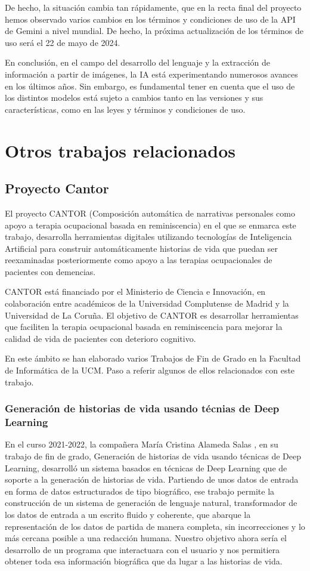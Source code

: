 De hecho, la situación cambia tan rápidamente, que en la recta final del proyecto hemos observado varios cambios en los términos y condiciones de uso de la API de Gemini a nivel mundial. De hecho, la próxima actualización de los términos de uso será el 22 de mayo de 2024.

En conclusión, en el campo del desarrollo del lenguaje y la extracción de información a partir de imágenes, la IA está experimentando numerosos avances en los últimos años. Sin embargo, es fundamental tener en cuenta que el uso de los distintos modelos está sujeto a cambios tanto en las versiones y sus características, como en las leyes y términos y condiciones de uso.

\section{Otros trabajos relacionados}
\subsection{Proyecto Cantor}
El proyecto CANTOR (Composición automática de narrativas personales como apoyo a terapia ocupacional basada en reminiscencia) en el que se enmarca este trabajo, desarrolla herramientas digitales utilizando tecnologías de Inteligencia Artificial para construir automáticamente historias de vida que puedan ser reexaminadas posteriormente como apoyo a las terapias ocupacionales de pacientes con demencias.

CANTOR está financiado por el Ministerio de Ciencia e Innovación, en colaboración entre académicos de la Universidad Complutense de Madrid y la Universidad de La Coruña. El objetivo de CANTOR es desarrollar herramientas que faciliten la terapia ocupacional basada en reminiscencia para mejorar la calidad de vida de pacientes con deterioro cognitivo.

En este ámbito se han elaborado varios Trabajos de Fin de Grado en la Facultad de Informática de la UCM. Paso a referir algunos de ellos relacionados con este trabajo. 

\subsubsection{Generación de historias de vida usando técnias de Deep Learning}
\label{sec:trabajocristina}
En el curso 2021-2022, la compañera María Cristina Alameda Salas \citep{cristinaalameda}, en su trabajo de fin de grado, Generación de historias de vida
usando técnicas de Deep Learning, desarrolló un sistema basados en técnicas
de Deep Learning que de soporte a la generación de historias de vida. Partiendo de unos datos de entrada en forma de datos estructurados de tipo biográfico, ese trabajo permite la construcción de un sistema de generación de lenguaje natural, transformador de los datos de entrada a un escrito fluido y coherente, que abarque la representación de los datos de partida de manera completa, sin incorrecciones y lo más cercana posible a una redacción humana. Nuestro objetivo ahora sería el desarrollo de un programa que interactuara con el usuario y nos permitiera obtener toda esa información biográfica que da lugar a las historias de vida. 
